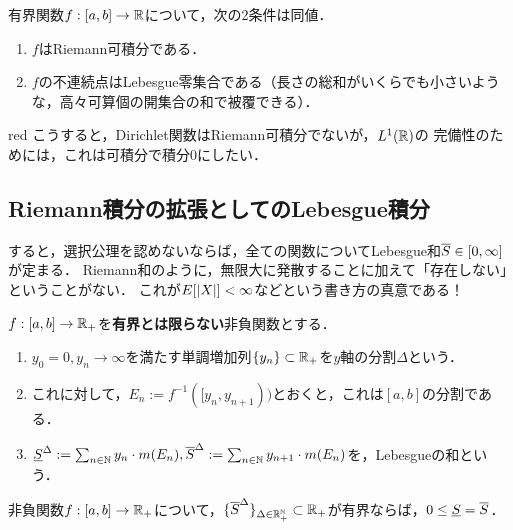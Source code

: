 \documentclass[uplatex, dvipdfmx]{jsreport}
\begin{document}
\begin{theorem}[Lebesgue (1902)]
    有界関数$f:[a,b]\to\mathbb{R}$について，次の2条件は同値．
    \begin{enumerate}
        \item $f$はRiemann可積分である．
        \item $f$の不連続点はLebesgue零集合である（長さの総和がいくらでも小さいような，高々可算個の開集合の和で被覆できる）．
    \end{enumerate}
\end{theorem}

\begin{tbox}{red}{}
    こうすると，Dirichlet関数はRiemann可積分でないが，$L^1(\mathbb{R})$の
    完備性のためには，これは可積分で積分$0$にしたい．
\end{tbox}

\subsection{Riemann積分の拡張としてのLebesgue積分}

\begin{tcolorbox}[colframe=ForestGreen, colback=ForestGreen!10!white,breakable,colbacktitle=ForestGreen!40!white,coltitle=black,fonttitle=\bfseries\sffamily,
title=]
    すると，選択公理を認めないならば，全ての関数についてLebesgue和$\overline{S}\in[0,\infty]$が定まる．
    Riemann和のように，無限大に発散することに加えて「存在しない」ということがない．
    これが$E[\lvert X\rvert]<\infty$などという書き方の真意である！
\end{tcolorbox}

\begin{notation}
    $f:[a,b]\to\mathbb{R}_+$を\textbf{有界とは限らない}非負関数とする．
    \begin{enumerate}
        \item $y_0=0,y_n\to\infty$を満たす単調増加列$\{y_n\}\subset\mathbb{R}_+$を$y$軸の分割$\Delta$という．
        \item これに対して，$E_n:=f^{-1}([y_n,y_{n+1}))$とおくと，これは$[a,b]$の分割である．
        \item $\underline{S}^\Delta:=\sum_{n\in\mathbb{N}}y_n\cdot m(E_n),\overline{S}^\Delta:=\sum_{n\in\mathbb{N}}y_{n+1}\cdot m(E_n)$を，Lebesgueの和という．
    \end{enumerate}
\end{notation}

\begin{theorem}
    非負関数$f:[a,b]\to\mathbb{R}_+$について，$\{\overline{S}^\Delta\}_{\Delta\in\mathbb{R}_+^{\mathbb{N}}}\subset\mathbb{R}_+$が有界ならば，$0\le \underline{S}=\overline{S}$．
\end{theorem}
\end{document}
